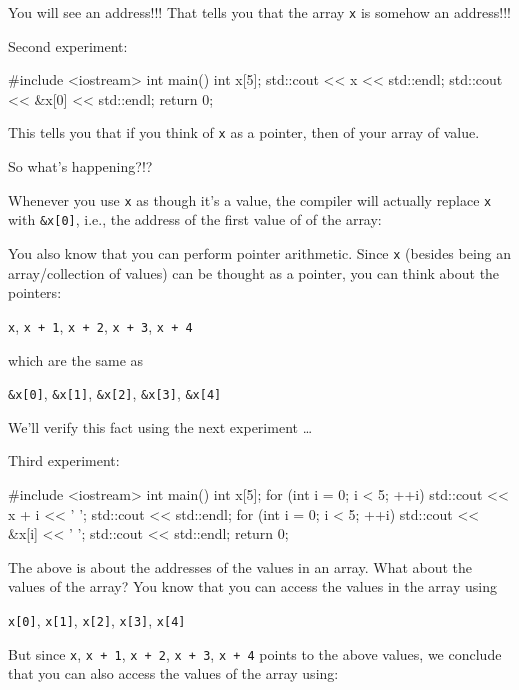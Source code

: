 You will see an address!!! That tells you that the array \texttt{x} is somehow an address!!!

Second experiment:

\begin{consolethree}[escapeinside=||]
#include <iostream>
int main()
{
    int x[5];
    std::cout << x << std::endl;
    std::cout << &x[0] << std::endl;
    return 0;
}
\end{consolethree}

This tells you that if you think of \texttt{x} as a pointer, then \texttt{} of your array of value.

So what's happening?!?

Whenever you use \texttt{x} as though it's a value, the compiler will actually replace \texttt{x} with \texttt{\&x[0]}, i.e., the address of the first value of of the array:
\begin{center}
\texttt{}\texttt{}
\end{center}
You also know that you can perform pointer arithmetic. Since \texttt{x} (besides being an array/collection of values) can be thought as a pointer, you can think about the pointers:
\begin{center}
\texttt{x}, \texttt{x + 1}, \texttt{x + 2}, \texttt{x + 3}, \texttt{x + 4}
\end{center}
which are the same as
\begin{center}
\texttt{\&x[0]}, \texttt{\&x[1]}, \texttt{\&x[2]}, \texttt{\&x[3]}, \texttt{\&x[4]}
\end{center}
We'll verify this fact using the next experiment \ldots{}

Third experiment:

\begin{consolethree}[escapeinside=||]
#include <iostream>
int main()
{
    int x[5];
    for (int i = 0; i < 5; ++i)
    {
        std::cout << x + i << ' ';
    }
    std::cout << std::endl;
    for (int i = 0; i < 5; ++i)
    {
        std::cout << &x[i] << ' ';
    }
    std::cout << std::endl;
    return 0;
}
\end{consolethree}

The above is about the addresses of the values in an array. What about
the values of the array? You know that you can access the values in the
array using
\begin{center}
\texttt{x[0]}, \texttt{x[1]}, \texttt{x[2]}, \texttt{x[3]}, \texttt{x[4]}
\end{center}
But since \texttt{x}, \texttt{x + 1}, \texttt{x + 2}, \texttt{x + 3}, \texttt{x + 4} points to the above values, we conclude that you can also access the values of the array using:

